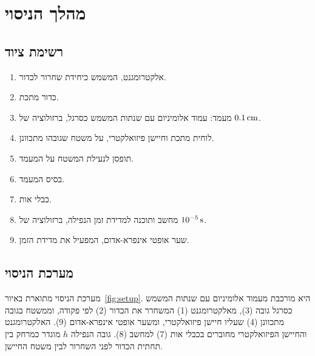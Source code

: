 \documentclass[10pt,a4paper]{article}
\newcommand{\added}[1]{\textcolor{addedblue}{#1}}
\newcommand{\partner}[1]{\textcolor{partnergreen}{#1}}
\newcommand{\U}[1]{\,\mathrm{#1}}
\begin{document}
\section*{מהלך הניסוי}
\noindent
\begin{minipage}[t]{0.52\textwidth}
\subsection*{רשימת ציוד}
\begin{enumerate}
  \item אלקטרומגנט, המשמש כיחידת שחרור לכדור.
  \item כדור מתכת.
  \item מעמד: \partner{עמוד אלומיניום עם שנתות} המשמש כסרגל, ברזולוציה של $\HRes\U{cm}$.
  \item לוחית מתכת וחיישן פיזואלקטרי, על משטח שגובהו מתכוונן.
  \item תופסן לנעילת המשטח על המעמד.
  \item בסיס המעמד.
  \item כבלי אות.
  \item מחשב ותוכנה למדידת זמן הנפילה, ברזולוציה של $\TRes\U{s}$.
  \item שער אופטי אינפרא-אדום\added{, המפעיל את מדידת הזמן}.
\end{enumerate}
\subsection*{מערכת הניסוי}
מערכת הניסוי מתוארת באיור~\ref{fig:setup}. היא מורכבת מ\partner{עמוד אלומיניום עם שנתות} המשמש כסרגל גובה (3), מאלקטרומגנט (1) המשחרר את הכדור (2) לפי פקודה, וממשטח בגובה מתכוונן (4) שעליו חיישן פיזואלקטרי\partner{, ומשער אופטי אינפרא-אדום (9)}.
האלקטרומגנט והחיישן הפיזואלקטרי מחוברים בכבלי אות (7) למחשב (8).
גובה הנפילה $h$ מוגדר כמרחק בין תחתית הכדור לפני השחרור לבין משטח החיישן.
\end{minipage}\hfill
\end{document}
